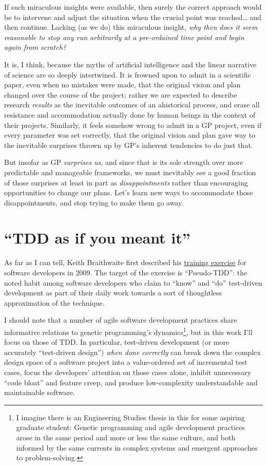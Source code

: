 If such miraculous insights were available, then surely the correct approach would be to intervene and adjust the situation when the crucial point was reached\ldots{} and then continue. Lacking (as we do) this miraculous insight, \emph{why then does it seem reasonable to stop any run arbitrarily at a pre-ordained time point and begin again from scratch?}

It is, I think, because the myths of artificial intelligence and the linear narrative of science are so deeply intertwined. It is frowned upon to admit in a scientific paper, even when no mistakes were made, that the original vision and plan changed over the course of the project; rather we are expected to describe research \emph{results} as the inevitable outcomes of an ahistorical process, and erase all resistance and accommodation actually done by human beings in the context of their projects. Similarly, it feels somehow wrong to admit in a GP project, even if every parameter was set correctly, that the original vision and plan gave way to the inevitable surprises thrown up by GP's inherent tendencies to do just that.

But insofar as GP \emph{surprises us}, and since that is its sole strength over more predictable and manageable frameworks, we must inevitably see a good fraction of those surprises at least in part as \emph{disappointments} rather than encouraging opportunities to change our plans.  Let's learn new ways to accommodate those disappointments, and stop trying to make them go away.

\section{``TDD as if you meant it''}\hypertarget{tdd-as-if-you-meant-it}{}\label{tdd-as-if-you-meant-it}

As far as I can tell, Keith Braithwaite first described his \href{http://cumulative-hypotheses.org/2011/08/30/tdd-as-if-you-meant-it/}{training exercise} for software developers in 2009. The target of the exercise is ``Pseudo-TDD'': the noted habit among software developers who claim to ``know'' and ``do'' test-driven development as part of their daily work towards a sort of thoughtless approximation of the technique.

I should note that a number of agile software development practices share informative relations to genetic programming's dynamics\footnote{I imagine there is an Engineering Studies thesis in this for some aspiring graduate student: Genetic programming and agile development practices arose in the same period and more or less the same culture, and both informed by the same currents in complex systems and emergent approaches to problem-solving.}, but in this work I'll focus on those of TDD. In particular, test-driven development (or more accurately ``test-driven design'') \emph{when done correctly} can break down the complex design space of a software project into a value-ordered set of incremental test cases, focus the developers' attention on those cases alone, inhibit unnecessary ``code bloat'' and feature creep, and produce low-complexity understandable and maintainable software.

